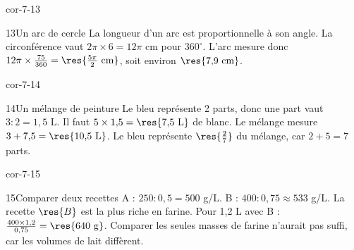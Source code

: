 \begin{blocLivre}{cor-7-13}\begin{corrige}{13}{Un arc de cercle}
La longueur d’un arc est proportionnelle à son angle. La circonférence vaut $2\pi\times6=12\pi$ cm pour $360^\circ$. L’arc mesure donc $12\pi\times\frac{75}{360}=\res{\frac{5\pi}2\ \mathrm{cm}}$, soit environ $\res{7{,}9\ \mathrm{cm}}$.
\label{fig-cor-7-13}
\end{corrige}\end{blocLivre}
\begin{blocLivre}{cor-7-14}\begin{corrige}{14}{Un mélange de peinture}
Le bleu représente 2 parts, donc une part vaut $3:2=1{,}5$ L. Il faut $5\times1{,}5=\res{7{,}5\ \mathrm L}$ de blanc. Le mélange mesure $3+7{,}5=\res{10{,}5\ \mathrm L}$. Le bleu représente $\res{\frac27}$ du mélange, car $2+5=7$ parts.
\end{corrige}\end{blocLivre}
\begin{blocLivre}{cor-7-15}\begin{corrige}{15}{Comparer deux recettes}
A : $250:0{,}5=500$ g/L. B : $400:0{,}75\approx533$ g/L. La recette $\res{B}$ est la plus riche en farine. Pour 1,2 L avec B : $\frac{400\times1{,}2}{0{,}75}=\res{640\ \mathrm g}$. Comparer les seules masses de farine n’aurait pas suffi, car les volumes de lait diffèrent.
\end{corrige}\end{blocLivre}
